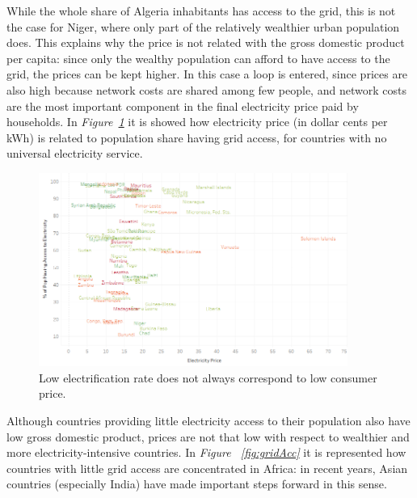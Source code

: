 \documentclass[a4paper,12pt]{book}
\begin{document}
While the whole share of Algeria inhabitants has access to the grid, this is not the case for Niger, where only part of the relatively wealthier urban population does. This explains why the price is not related with the gross domestic product per capita: since only the wealthy population can afford to have access to the grid, the prices can be kept higher. In this case a loop is entered, since prices are also high because network costs are shared among few people, and network costs are the most important component in the final electricity price paid by households. In \textit{Figure~\ref{fig:northsouth}} it is showed how electricity price (in dollar cents per kWh) is related to population share having grid access, for countries with no universal electricity service.

\begin{figure}[htb]
\begin{center}
\captionsetup{justification=centering}
\includegraphics[width=0.9\textwidth]{Images/accessNAMES.png}
\caption{Low electrification rate does not always correspond to low consumer price.}
\label{fig:northsouth}
\end{center}
\end{figure}

Although countries providing little electricity access to their population also have low gross domestic product, prices are not that low with respect to wealthier and more electricity-intensive countries. In \textit{Figure ~\ref{fig:gridAcc}} it is represented how countries with little grid access are concentrated in Africa: in recent years, Asian countries (especially India) have made important steps forward in this sense.
\end{document}
